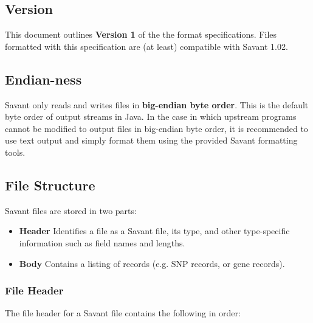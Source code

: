 \documentclass{report}
\begin{document}
\subsection{Version}

This document outlines {\bf Version 1} of the the format specifications. Files formatted with this specification are (at least) compatible with Savant 1.02.

\subsection{Endian-ness}

Savant only reads and writes files in {\bf big-endian byte order}. This is the default byte order of output streams in Java. In the case in which upstream programs cannot be modified to output files in big-endian byte order, it is recommended to use text output and simply format them using the provided Savant formatting tools.

\subsection{File Structure}

Savant files are stored in two parts:

\begin{itemize}
\item{} {\bf Header} Identifies a file as a Savant file, its type, and other type-specific information such as field names and lengths.
\item{} {\bf Body} Contains a listing of records (e.g. SNP records, or gene records).
\end{itemize}

\subsubsection{File Header}

The file header for a Savant file contains the following in order:
\end{document}
